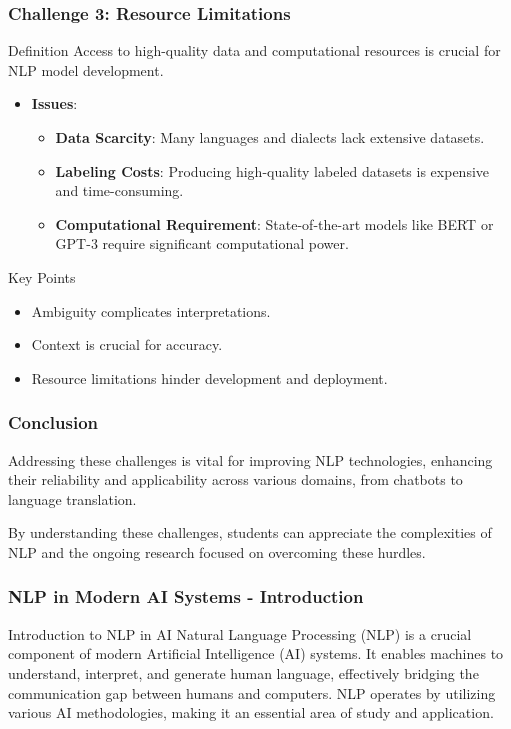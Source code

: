 \documentclass[aspectratio=169]{beamer}
\begin{document}
\begin{frame}[fragile]
    \frametitle{Challenge 3: Resource Limitations}
    \begin{block}{Definition}
        Access to high-quality data and computational resources is crucial for NLP model development.
    \end{block}

    \begin{itemize}
        \item \textbf{Issues}:
        \begin{itemize}
            \item \textbf{Data Scarcity}: Many languages and dialects lack extensive datasets.
            \item \textbf{Labeling Costs}: Producing high-quality labeled datasets is expensive and time-consuming.
            \item \textbf{Computational Requirement}: State-of-the-art models like BERT or GPT-3 require significant computational power.
        \end{itemize}
    \end{itemize}
    
    \begin{block}{Key Points}
        \begin{itemize}
            \item Ambiguity complicates interpretations.
            \item Context is crucial for accuracy.
            \item Resource limitations hinder development and deployment.
        \end{itemize}
    \end{block}
\end{frame}

\begin{frame}[fragile]
    \frametitle{Conclusion}
    Addressing these challenges is vital for improving NLP technologies, enhancing their reliability and applicability across various domains, from chatbots to language translation. 

    By understanding these challenges, students can appreciate the complexities of NLP and the ongoing research focused on overcoming these hurdles.
\end{frame}

\begin{frame}[fragile]
    \frametitle{NLP in Modern AI Systems - Introduction}
    \begin{block}{Introduction to NLP in AI}
        Natural Language Processing (NLP) is a crucial component of modern Artificial Intelligence (AI) systems. It enables machines to understand, interpret, and generate human language, effectively bridging the communication gap between humans and computers. NLP operates by utilizing various AI methodologies, making it an essential area of study and application.
    \end{block}
\end{frame}
\end{document}
